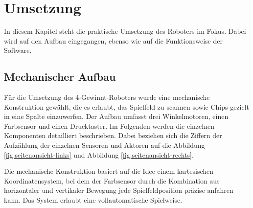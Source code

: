 \chapter{ Umsetzung}
\label{cha:Umsetzung}
In diesem Kapitel steht die praktische Umsetzung des Roboters im Fokus. Dabei wird auf den Aufbau eingegangen, ebenso wie auf die Funktionsweise der Software. 


\section{Mechanischer Aufbau}
Für die Umsetzung des 4-Gewinnt-Roboters wurde eine mechanische Konstruktion gewählt, die es erlaubt, das Spielfeld zu scannen sowie Chips gezielt in eine Spalte einzuwerfen. Der Aufbau umfasst drei Winkelmotoren, einen Farbsensor und einen Drucktaster. Im Folgenden werden die einzelnen Komponenten detailliert beschrieben. Dabei beziehen sich die Ziffern der Aufzählung der einzelnen Sensoren und Aktoren auf die Abbildung \ref{fig:seitenansicht-links} und Abbildung \ref{fig:seitenansicht-rechts}.

Die mechanische Konstruktion basiert auf die Idee einem kartesischen Koordinatensystem, bei dem der Farbsensor durch die Kombination aus horizontaler und vertikaler Bewegung jede Spielfeldposition präzise anfahren kann. Das System erlaubt eine vollautomatische Spielweise.

